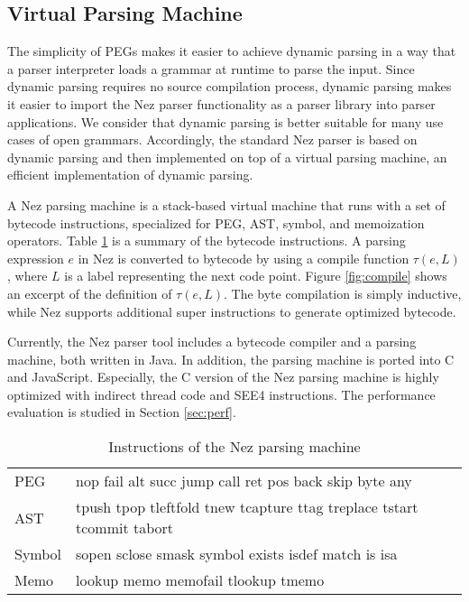\documentclass[preprint]{sigplanconf}
\begin{document}
\subsection{Virtual Parsing Machine}

The simplicity of PEGs makes it easier to achieve dynamic parsing in a way that a parser interpreter loads a grammar  at runtime to parse the input. Since dynamic parsing requires no source compilation process, dynamic parsing makes it easier to import the Nez parser functionality as a parser library into parser applications. We consider that dynamic parsing is better suitable for many use cases of open grammars. Accordingly, the standard Nez parser is based on dynamic parsing and then implemented on top of a virtual parsing machine, an efficient implementation of dynamic parsing. 

A Nez parsing machine is a stack-based virtual machine that runs with a set of bytecode instructions, specialized for PEG, AST, symbol, and memoization operators. Table \ref{table:insts} is a summary of the bytecode instructions. A parsing expression $e$ in Nez is converted to bytecode by using a compile function $\tau(e, L)$, where $L$ is a label representing the next code point. Figure \ref{fig:compile} shows an excerpt of the definition of $\tau(e, L)$. The byte compilation is simply inductive, while Nez supports additional super instructions to generate optimized bytecode.  

Currently, the Nez parser tool includes a bytecode compiler and a parsing machine, both written in Java. In addition, the parsing machine is ported into C and JavaScript. Especially, the C version of the Nez parsing machine is highly optimized with indirect thread code and SEE4 instructions. The performance evaluation is studied in Section \ref{sec:perf}.

\begin{table}[tb]
\begin{tabular}{lp{6cm}}
PEG &
\textsf{
\noindent
nop fail alt succ jump call ret pos back skip byte any 
} \\
AST &
\textsf{
\noindent
tpush tpop tleftfold tnew tcapture ttag treplace 
tstart tcommit tabort 
} \\
Symbol &
\textsf{
\noindent
sopen sclose smask symbol exists isdef match is isa 
} \\
Memo &
\textsf{
\noindent
lookup memo memofail tlookup tmemo
} \\

\end{tabular}

\caption{Instructions of the Nez parsing machine}
\label{table:insts}

\end{table}
\end{document}
